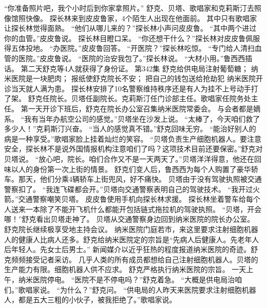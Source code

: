 \documentclass[a4paper,12pt,UTF8,twoside]{ctexbook}
\begin{document}
        “你准备照片吧，我个小时后到你家拿照片。”  
        舒克、贝塔、歌唱家和克莉斯汀去照像馆照快像。  
        探长林来到皮皮鲁家，4个陌生人出现在他面前。  
        其中只有歌唱家让探长林觉得面熟。  
        “他们从哪儿来的？”探长林小声问皮皮鲁。  
        “其中两个进过你的血管。”皮皮鲁说。  
        探长林目瞪口呆。  
        “你还想干什么？”探长林对皮皮鲁佩服得五体投地。  
        “办医院。”皮皮鲁回答。  
        “开医院？”探长林吃惊。  
        “专门给人清扫血管的医院。”皮皮鲁说。  
        “医院的治安我包了。”探长林说。  
        “大材小用。”鲁西西插话。  
        第二天舒克等4人就获得了身份证。          第342集  
        舒克给供电局注射葡萄糖；  
        纳米医院是一块肥肉；  
        报纸使舒克院长不安；  
        把自己的钱包送给抢劫犯    
        纳米医院开诊当天就人满为患。  
        探长林安排了10名警察维持秩序还是有人为挂不上号动手打了架。  
        舒克任院长。贝塔任副院长。克莉斯汀任门诊部主任。歌唱家任院务处主任。  
        第一天开诊下班后，舒克在院长办公室召集纳米医院常委会。  
        与会者都是嫡系。  
        “我有当年办航空公司的感觉。”贝塔坐在沙发上说。  
        “太棒了，今天咱们救了多少人！”克莉斯汀兴奋。  
        “当人的感觉真不错。”舒克回味无穷。  
        “能治好别人的病是一种享受。”歌唱家脸上挂着灿烂的笑容。  
        “贝塔负责生产细胞机器人。要注意安全，探长林不是说外国情报机构注意咱们了吗？这项技术目前还要保密。”舒克对贝塔说。  
        “放心吧，院长。咱们合作又不是一天两天了。”贝塔洋洋得意，他还在回味以人的身份第一次上街的情景。  
        舒克们变人后，鲁西西为每个人购置了豪华轿车。那天，他们分乘4辆轿车上街兜风，好不痛快。  
        贝塔由于没有驾驶执照被交通警察扣了。  
        “我连飞碟都会开。”贝塔向交通警察表明自己的驾驶技术。  
        “我开过火箭。”交通警察嘲笑贝塔。  
        皮皮鲁使用手机向探长林求援。  
        探长林坐着警车给每个人送来一本除了不能开飞机什么都能开包括链式拖拉机的驾驶执照。  
        “贝塔，开会哪！”舒克看出贝塔走神了。  
        贝塔从交通警察身边回到纳米医院的院长办公室。  
        舒克院长继续极享受地主持会议。  
        纳米医院门庭若市，来这里要求注射细胞机器        
        人的健康人比病人还多。舒克给纳米医院定的宗旨是“先病人后健康人。先老年人后年轻人。先女士后男士。”  
        新闻媒介以近乎狂热的程度报道纳米医院的奇迹。舒克频频接受记者采访。  
        几乎人类的所有成员都想给自己注射细胞机器人。贝塔的生产能力有限。细胞机器人供不应求。  
        舒克严格执行纳米医院的宗旨。  
        一天上午，纳米医院停电。  
        “医院不是不停电吗？”舒克着急。  
        “大概是供电局治咱们。”歌唱家说。  
        “为什么？”舒克问。  
        “供电局的人昨天来医院要求注射细胞机器人，都是五大三粗的小伙子，被我拒绝了。”歌唱家说。  
\end{document}
